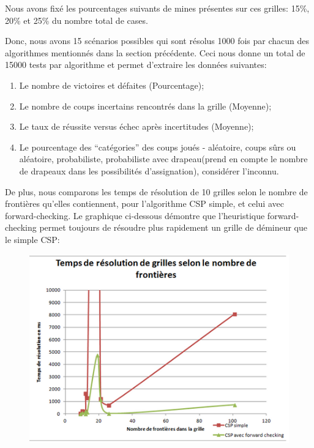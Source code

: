 \documentclass{article}
\begin{document}
Nous avons fixé les pourcentages suivants de mines présentes sur ces grilles: 15\%, 20\% et 25\% du nombre total de cases.

Donc, nous avons 15 scénarios possibles qui sont résolus 1000 fois par chacun des 
algorithmes mentionnés dans la section précédente. Ceci nous donne un total de 15000 
tests par algorithme et permet d’extraire les données suivantes: 

\begin{enumerate}
        \item Le nombre de victoires et défaites (Pourcentage);
        \item Le nombre de coups incertains rencontrés dans la grille (Moyenne);
        \item Le taux de réussite versus échec après incertitudes (Moyenne);
        \item Le pourcentage des “catégories” des coups joués - aléatoire, coups 
              sûrs ou aléatoire, probabiliste, probabiliste avec drapeau(prend en 
              compte le nombre de drapeaux dans les possibilités d’assignation), 
              considérer l’inconnu.
\end{enumerate}

De plus, nous comparons les temps de résolution de 10 grilles selon le nombre de 
frontières qu’elles contiennent, pour l’algorithme CSP simple, et celui avec forward-checking.
Le graphique ci-dessous démontre que l’heuristique forward-checking permet toujours de 
résoudre plus rapidement un grille de démineur que le simple CSP:

\begin{figure}[h!]
  \centering
  \includegraphics[scale=.5]{./vitesse.png}
\end{figure}
\end{document}
